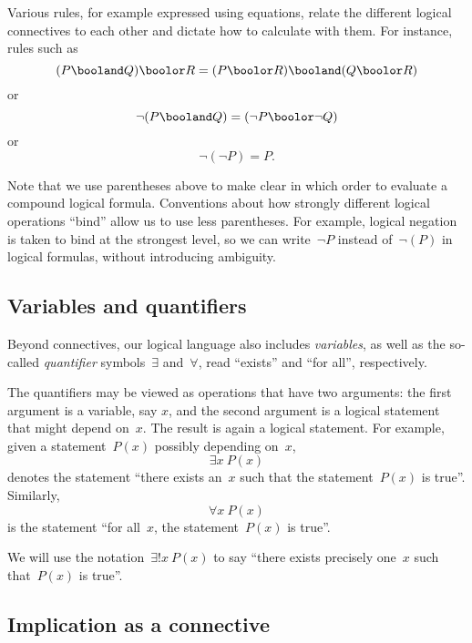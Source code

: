 Various rules, for example expressed using equations, relate the different logical connectives to each other and dictate how to calculate with them.
For instance, rules such as
\begin{equation*}
    (P \booland Q) \boolor R = (P \boolor R) \booland (Q \boolor R)
\end{equation*}
or
\begin{equation*}
    \lnot (P \booland Q)  = (\lnot P \boolor \lnot Q)
\end{equation*}
or
\begin{equation*}
    \lnot (\lnot P) = P.
\end{equation*}

Note that we use parentheses above to make clear in which order to evaluate a compound logical formula.
Conventions about how strongly different logical operations ``bind'' allow us to use less parentheses.
For example, logical negation is taken to bind at the strongest level, so we can write~$\lnot P$ instead of~$\lnot (P)$ in logical formulas, without introducing ambiguity.

\subsection{Variables and quantifiers}

Beyond connectives, our logical language also includes \emph{variables}, as well as the so-called \emph{quantifier} symbols~$\exists$ and~$\forall$, read ``exists'' and ``for all'', respectively.

The quantifiers may be viewed as operations that have two arguments: the first argument is a variable, say $x$, and the second argument is a logical statement that might depend on~$x$.
The result is again a logical statement.
For example, given a statement~$P(x)$ possibly depending on~$x$,
\begin{equation*}
    \exists x \ P(x)
\end{equation*}
denotes the statement ``there exists an~$x$ such that the statement~$P(x)$ is true''.
Similarly,
\begin{equation*}
    \forall x \ P(x)
\end{equation*}
is the statement ``for all~$x$, the statement~$P(x)$ is true''.

We will use the notation~$\exists!
    x \ P(x)$ to say ``there exists precisely one~$x$ such that~$P(x)$ is true''.

\subsection{Implication as a connective}

